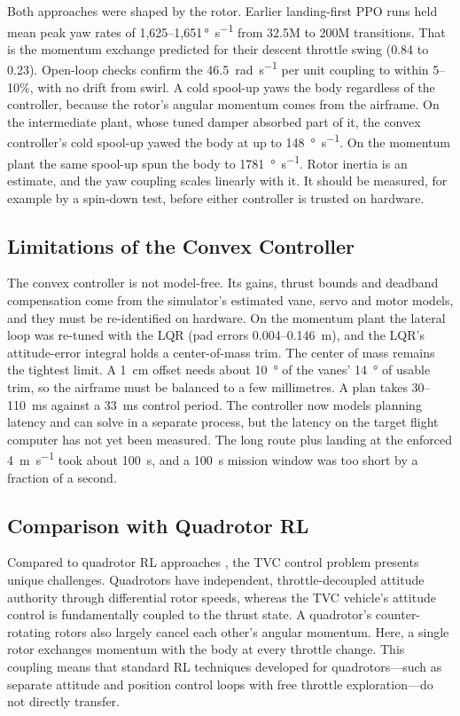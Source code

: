 \documentclass[conference]{IEEEtran}
\begin{document}
Both approaches were shaped by the rotor. Earlier landing-first PPO runs held mean peak yaw rates of 1{,}625--1{,}651\,\si{\degree\per\second} from 32.5M to 200M transitions. That is the momentum exchange predicted for their descent throttle swing (0.84 to 0.23). Open-loop checks confirm the \SI{46.5}{\radian\per\second} per unit coupling to within 5--10\%, with no drift from swirl. A cold spool-up yaws the body regardless of the controller, because the rotor's angular momentum comes from the airframe. On the intermediate plant, whose tuned damper absorbed part of it, the convex controller's cold spool-up yawed the body at up to \SI{148}{\degree\per\second}. On the momentum plant the same spool-up spun the body to \SI{1781}{\degree\per\second}. Rotor inertia is an estimate, and the yaw coupling scales linearly with it. It should be measured, for example by a spin-down test, before either controller is trusted on hardware.

\subsection{Limitations of the Convex Controller}

The convex controller is not model-free. Its gains, thrust bounds and deadband compensation come from the simulator's estimated vane, servo and motor models, and they must be re-identified on hardware. On the momentum plant the lateral loop was re-tuned with the LQR (pad errors 0.004--\SI{0.146}{\metre}), and the LQR's attitude-error integral holds a center-of-mass trim. The center of mass remains the tightest limit. A \SI{1}{\centi\metre} offset needs about \SI{10}{\degree} of the vanes' \SI{14}{\degree} of usable trim, so the airframe must be balanced to a few millimetres. A plan takes 30--\SI{110}{\milli\second} against a \SI{33}{\milli\second} control period. The controller now models planning latency and can solve in a separate process, but the latency on the target flight computer has not yet been measured. The long route plus landing at the enforced \SI{4}{\metre\per\second} took about \SI{100}{\second}, and a \SI{100}{\second} mission window was too short by a fraction of a second.

\subsection{Comparison with Quadrotor RL}

Compared to quadrotor RL approaches \cite{b2, b3}, the TVC control problem presents unique challenges. Quadrotors have independent, throttle-decoupled attitude authority through differential rotor speeds, whereas the TVC vehicle's attitude control is fundamentally coupled to the thrust state. A quadrotor's counter-rotating rotors also largely cancel each other's angular momentum. Here, a single rotor exchanges momentum with the body at every throttle change. This coupling means that standard RL techniques developed for quadrotors---such as separate attitude and position control loops with free throttle exploration---do not directly transfer.
\end{document}
